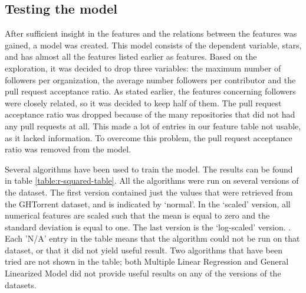     
    \subsection{Testing the model}
        After sufficient insight in the features and the relations between the features was gained, a model was created. 
        This model consists of the dependent variable, stars, and has almost all the features listed earlier as features. 
        Based on the exploration, it was decided to drop three variables: the maximum number of followers per organization, the average number followers per contributor and the pull request acceptance ratio.
        As stated earlier, the features concerning followers were closely related, so it was decided to keep half of them. 
        The pull request acceptance ratio was dropped because of the many repositories that did not had any pull requests at all. 
        This made a lot of entries in our feature table not usable, as it lacked information. 
        To overcome this problem, the pull request acceptance ratio was removed from the model.
        
        Several algorithms have been used to train the model. 
        The results can be found in table \ref{table:r-squared-table}.
        All the algorithms were run on several versions of the dataset. The first version contained just the values that were retrieved from the GHTorrent dataset, and is indicated by `normal'. 
        In the `scaled' version, all numerical features are scaled such that the mean is equal to zero and the standard deviation is equal to one. 
        The last version is the `log-scaled' version. .
        Each 'N/A' entry in the table means that the algorithm could not be run on that dataset, or that it did not yield useful result.
        Two algorithms that have been tried are not shown in the table; both Multiple Linear Regression and General Linearized Model did not provide useful results on any of the versions of the datasets.
        
